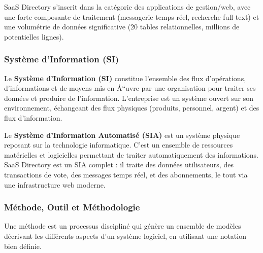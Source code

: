 SaaS Directory s'inscrit dans la catégorie des applications de gestion/web, avec une forte composante de traitement (messagerie temps réel, recherche full-text) et une volumétrie de données significative (20 tables relationnelles, millions de potentielles lignes).





\subsubsection{Système d'Information (SI)}





Le \textbf{Système d'Information (SI)} constitue l'ensemble des flux d'opérations, d'informations et de moyens mis en Å“uvre par une organisation pour traiter ses données et produire de l'information. L'entreprise est un système ouvert sur son environnement, échangeant des flux physiques (produits, personnel, argent) et des flux d'information.





Le \textbf{Système d'Information Automatisé (SIA)} est un système physique reposant sur la technologie informatique. C'est un ensemble de ressources matérielles et logicielles permettant de traiter automatiquement des informations. SaaS Directory est un SIA complet : il traite des données utilisateurs, des transactions de vote, des messages temps réel, et des abonnements, le tout via une infrastructure web moderne.





\subsubsection{Méthode, Outil et Méthodologie}





\begin{definitionbox}[title={Définition : Méthode (Grady Booch, 1994)}]


Une méthode est un processus discipliné qui génère un ensemble de modèles décrivant les différents aspects d'un système logiciel, en utilisant une notation bien définie.


\end{definitionbox}





